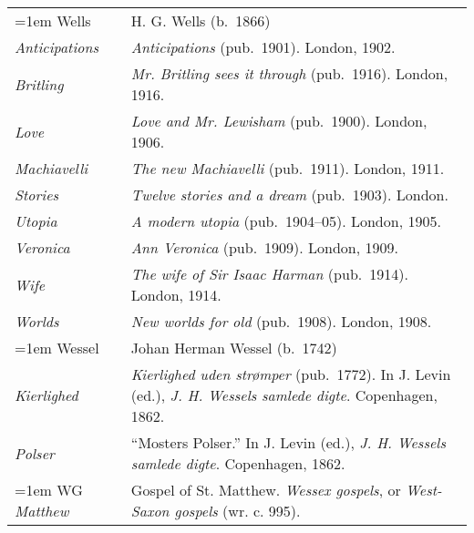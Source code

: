 \begin{xltabular}{\textwidth}{ lQ }
\hangindent=1em  Wells & H. G. Wells (b.~1866) \\
\hspace{1em}\textit{Anticipa\-tions} & \textit{Anticipations} (pub.~1901). London, 1902. \\
\hspace{1em}\textit{Britling} & \textit{Mr. Britling sees it through} (pub.~1916). London, 1916. \\
\hspace{1em}\textit{Love} & \textit{Love and Mr. Lewisham} (pub.~1900). London, 1906. \\
\hspace{1em}\textit{Machiavelli} & \textit{The new Machiavelli} (pub.~1911). London, 1911. \\
\hspace{1em}\textit{Stories} & \textit{Twelve stories and a dream} (pub.~1903). London. \\
\hspace{1em}\textit{Utopia} & \textit{A modern utopia} (pub.~1904--05). London, 1905. \\
\hspace{1em}\textit{Veronica} & \textit{Ann Veronica} (pub.~1909). London, 1909. \\
\hspace{1em}\textit{Wife} & \textit{The wife of Sir Isaac Harman} (pub.~1914). London, 1914. \\
\hspace{1em}\textit{Worlds} & \textit{New worlds for old} (pub.~1908). London, 1908. \\

\hangindent=1em  Wessel & Johan Herman Wessel (b.~1742) \\
\hspace{1em}\textit{Kierlighed} & \textit{Kierlighed uden strømper} (pub.~1772). In J. Levin (ed.), \textit{J. H. Wessels samlede digte}. Copenhagen, 1862. \\ %
\hspace{1em}\textit{Polser} & ``Mosters Polser.'' In J. Levin (ed.), \textit{J. H. Wessels samlede digte}. Copenhagen, 1862.\\

\hangindent=1em  WG \textit{Matthew} & Gospel of St. Matthew. \textit{Wessex gospels}, or \textit{West-Saxon gospels} (wr. c. 995). \\ %


\end{xltabular}
